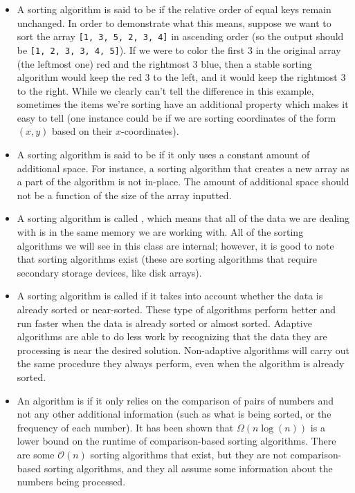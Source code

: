 \begin{itemize}
    \item A sorting algorithm is said to be  if the relative order of equal keys remain unchanged. In order to demonstrate what this means, suppose we want to sort the array \verb![1, 3, 5, 2, 3, 4]! in ascending order (so the output should be \verb![1, 2, 3, 3, 4, 5]!). If we were to color the first $3$ in the original array (the leftmost one) red and the rightmost $3$ blue, then a stable sorting algorithm would keep the red $3$ to the left, and it would keep the rightmost $3$ to the right. While we clearly can't tell the difference in this example, sometimes the items we're sorting have an additional property which makes it easy to tell (one instance could be if we are sorting coordinates of the form $(x, y)$ based on their $x$-coordinates). 
    \item A sorting algorithm is said to be  if it only uses a constant amount of additional space. For instance, a sorting algorithm that creates a new array as a part of the algorithm is not in-place. The amount of additional space should not be a function of the size of the array inputted.
    \item A sorting algorithm is called , which means that all of the data we are dealing with is in the same memory we are working with. All of the sorting algorithms we will see in this class are internal; however, it is good to note that  sorting algorithms exist (these are sorting algorithms that require secondary storage devices, like disk arrays).
    \item A sorting algorithm is called  if it takes into account whether the data is already sorted or near-sorted. These type of algorithms perform better and run faster when the data is already sorted or almost sorted. Adaptive algorithms are able to do less work by recognizing that the data they are processing is near the desired solution. Non-adaptive algorithms will carry out the same procedure they always perform, even when the algorithm is already sorted.  
    \item An algorithm is  if it only relies on the comparison of pairs of numbers and not any other additional information (such as what is being sorted, or the frequency of each number). It has been shown that $\Omega(n\log(n))$ is a lower bound on the runtime of comparison-based sorting algorithms. There are some $\mathcal{O}(n)$ sorting algorithms that exist, but they are not comparison-based sorting algorithms, and they all assume some information about the numbers being processed.
\end{itemize}

